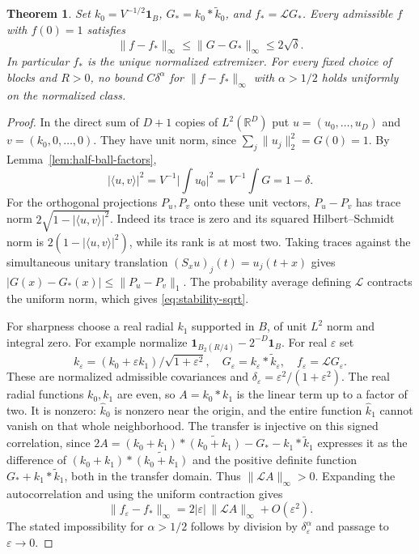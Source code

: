 \documentclass[11pt,a4paper]{article}
\newtheorem{theorem}{Theorem}[section]\newtheorem{lemma}[theorem]{Lemma}\newtheorem{proposition}[theorem]{Proposition}\newtheorem{corollary}[theorem]{Corollary}
\numberwithin{equation}{section}
\begin{document}
\begin{theorem}\label{thm:sharp-stability}
Set $k_0=V^{-1/2}\mathbf1_B$, $G_*=k_0*\widetilde k_0$, and
$f_*=\mathcal L G_*$. Every admissible $f$ with $f(0)=1$ satisfies
\begin{equation}
 \|f-f_*\|_\infty\le\|G-G_*\|_\infty\le 2\sqrt{\delta}.
 \label{eq:stability-sqrt}
\end{equation}
In particular $f_*$ is the unique normalized extremizer. For every fixed
choice of blocks and $R>0$, no bound $C\delta^\alpha$ for
$\|f-f_*\|_\infty$ with $\alpha>1/2$ holds uniformly on the normalized
class.
\end{theorem}

\begin{proof}
In the direct sum of $D+1$ copies of $L^2(\mathbb R^D)$ put
$u=(u_0,\ldots,u_D)$ and $v=(k_0,0,\ldots,0)$. They have unit norm,
since $\sum_j\|u_j\|_2^2=G(0)=1$. By Lemma~\ref{lem:half-ball-factors},
\[
 |\langle u,v\rangle|^2
 =V^{-1}\Big|\int u_0\Big|^2=V^{-1}\int G=1-\delta.
\]
For the orthogonal projections $P_u,P_v$ onto these unit vectors,
$P_u-P_v$ has trace norm $2\sqrt{1-|\langle u,v\rangle|^2}$.
Indeed its trace is zero and its squared Hilbert--Schmidt norm is
$2(1-|\langle u,v\rangle|^2)$, while its rank is at most two.
Taking traces against the simultaneous unitary translation
$(S_x u)_j(t)=u_j(t+x)$ gives
$|G(x)-G_*(x)|\le\|P_u-P_v\|_1$. The probability average defining
$\mathcal L$ contracts the uniform norm, which gives
\eqref{eq:stability-sqrt}.

For sharpness choose a real radial $k_1$ supported in $B$, of unit
$L^2$ norm and integral zero. For example normalize
$\mathbf1_{B_2(R/4)}-2^{-D}\mathbf1_B$. For real $\varepsilon$ set
\[
 k_\varepsilon=(k_0+\varepsilon k_1)/\sqrt{1+\varepsilon^2},
 \quad G_\varepsilon=k_\varepsilon*\widetilde k_\varepsilon,
 \quad f_\varepsilon=\mathcal L G_\varepsilon.
\]
These are normalized admissible covariances and
$\delta_\varepsilon=\varepsilon^2/(1+\varepsilon^2)$. The real radial
functions $k_0,k_1$ are even, so $A=k_0*k_1$ is the linear term up to a
factor of two. It is nonzero: $\widehat k_0$ is nonzero near the origin,
and the entire function $\widehat k_1$ cannot vanish on that whole
neighborhood. The transfer is injective on this signed correlation, since
$2A=(k_0+k_1)*\widetilde{(k_0+k_1)}-G_*-k_1*\widetilde k_1$ expresses
it as the difference of $(k_0+k_1)*\widetilde{(k_0+k_1)}$ and the positive
definite function $G_*+k_1*\widetilde k_1$, both in the transfer domain. Thus
$\|\mathcal L A\|_\infty>0$. Expanding the autocorrelation and using the
uniform contraction gives
\[
 \|f_\varepsilon-f_*\|_\infty
 =2|\varepsilon|\,\|\mathcal L A\|_\infty+O(\varepsilon^2).
\]
The stated impossibility for $\alpha>1/2$ follows by division by
$\delta_\varepsilon^\alpha$ and passage to $\varepsilon\to0$.
\end{proof}
\end{document}
